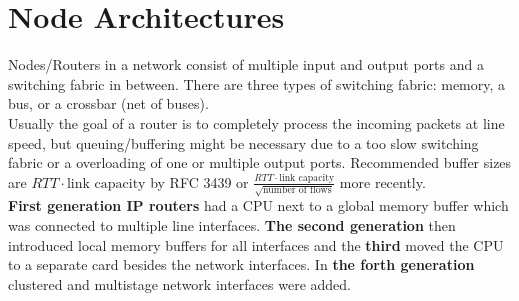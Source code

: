 
\section{Node Architectures}
Nodes/Routers in a network consist of multiple input and output ports and a switching fabric in between.
There are three types of switching fabric: memory, a bus, or a crossbar (net of buses).\\
Usually the goal of a router is to completely process the incoming packets at line speed, but queuing/buffering might be necessary due to a too slow switching fabric or a overloading of one or multiple output ports.
Recommended buffer sizes are $RTT \cdot \text{link capacity}$ by RFC 3439 or $\frac{RTT \cdot \text{link capacity}} {\sqrt{\text{number of flows}}}$ more recently.\\

\textbf{First generation IP routers} had a CPU next to a global memory buffer which was connected to multiple line interfaces.
\textbf{The second generation} then introduced local memory buffers for all interfaces and the \textbf{third} moved the CPU to a separate card besides the network interfaces.
In \textbf{the forth generation} clustered and multistage network interfaces were added.
